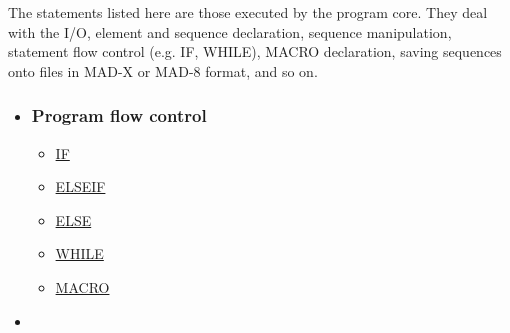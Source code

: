  The statements listed here are those executed by the program core. They deal with the I/O, element and sequence declaration, sequence manipulation, statement flow control (e.g. IF, WHILE), MACRO declaration, saving sequences onto files in MAD-X or MAD-8 format, and so on. 
\begin{itemize}
	\item 

\subsubsection{Program flow control}
\begin{itemize}
	\item \href{special.html#if}{IF}
	\item \href{special.html#elseif}{ELSEIF}
	\item \href{special.html#else}{ELSE}
	\item \href{special.html#while}{WHILE}
	\item \href{special.html#macro}{MACRO}
\end{itemize}


	\item 


\end{itemize}
